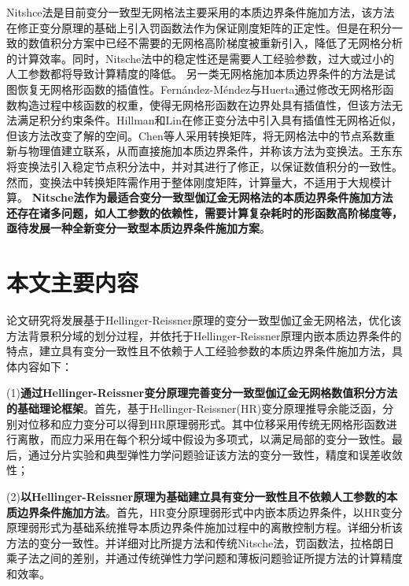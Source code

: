 Nitshce法\textsuperscript{\cite{fernandez-mendez2004}}是目前变分一致型无网格法主要采用的本质边界条件施加方法，该方法在修正变分原理的基础上引入罚函数法作为保证刚度矩阵的正定性。但是在积分一致的数值积分方案中已经不需要的无网格高阶梯度被重新引入，降低了无网格分析的计算效率。同时，Nitsche法中的稳定性还是需要人工经验参数，过大或过小的人工参数都将导致计算精度的降低。
另一类无网格施加本质边界条件的方法是试图恢复无网格形函数的插值性。Fernández-Méndez与Huerta\textsuperscript{\cite{fernandez-mendez2004}}通过修改无网格形函数构造过程中核函数的权重，使得无网格形函数在边界处具有插值性，但该方法无法满足积分约束条件。Hillman和Lin\textsuperscript{\cite{hillman2021}}在修正变分法中引入具有插值性无网格近似，但该方法改变了解的空间。Chen等人\textsuperscript{\cite{chen1996}}采用转换矩阵，将无网格法中的节点系数重新与物理值建立联系，从而直接施加本质边界条件，并称该方法为变换法。王东东\textsuperscript{\cite{wang2015}}将变换法引入稳定节点积分法中，并对其进行了修正，以保证数值积分的一致性。然而，变换法中转换矩阵需作用于整体刚度矩阵，计算量大，不适用于大规模计算。
\textbf{Nitsche法作为最适合变分一致型伽辽金无网格法的本质边界条件施加方法还存在诸多问题，如人工参数的依赖性，需要计算复杂耗时的形函数高阶梯度等，亟待发展一种全新变分一致型本质边界条件施加方案}。
\section{本文主要内容}
论文研究将发展基于Hellinger-Reissner原理的变分一致型伽辽金无网格法，优化该方法背景积分域的划分过程，并依托于Hellinger-Reissner原理内嵌本质边界条件的特点，建立具有变分一致性且不依赖于人工经验参数的本质边界条件施加方法，具体内容如下：\par
(1)\textbf{通过Hellinger-Reissner变分原理完善变分一致型伽辽金无网格数值积分方法的基础理论框架}。首先，基于Hellinger-Reissner(HR)变分原理推导余能泛函，分别对位移和应力变分可以得到HR原理弱形式。其中位移采用传统无网格形函数进行离散，而应力采用在每个积分域中假设为多项式，以满足局部的变分一致性。最后，通过分片实验和典型弹性力学问题验证该方法的变分一致性，精度和误差收敛性；\par
(2)\textbf{以Hellinger-Reissner原理为基础建立具有变分一致性且不依赖人工参数的本质边界条件施加方法}。首先，HR变分原理弱形式中内嵌本质边界条件，以HR变分原理弱形式为基础系统推导本质边界条件施加过程中的离散控制方程。详细分析该方法的变分一致性。并详细对比所提方法和传统Nitsche法，罚函数法，拉格朗日乘子法之间的差别，并通过传统弹性力学问题和薄板问题验证所提方法的计算精度和效率。



